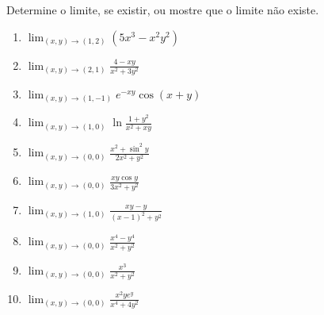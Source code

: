 \documentclass[11pt,a4paper]{article}
\newcommand{\limite}{\displaystyle\lim}
\begin{document}
\begin{enumerate}
Determine o limite, se existir, ou mostre que o limite não existe.
	
	\begin{enumerate}
		\item $\limite_{(x,y) \to (1,2)} (5x^3 - x^2y^2)$
		\item $\limite_{(x,y) \to (2,1)} \displaystyle\frac{4 - xy}{x^2 + 3y^2}$
		
		
		
		
		
		
		
		
		
		
		
		
		
		
		
		
		
		
		
		
		
		
		
		
		
		
		\item $\limite_{(x,y) \to (1,-1)} e^{-xy}\cos (x + y)$
		\item $\limite_{(x,y) \to (1,0)} \ln \displaystyle\frac{1 + y^2}{x^2 + xy}$
		\item $\limite_{(x,y) \to (0,0)} \displaystyle\frac{x^2 + \sin^2 y}{2x^2 + y^2}$
		\item $\limite_{(x,y) \to (0,0)} \displaystyle\frac{xy\cos y}{3x^2 + y^2}$
		\item $\limite_{(x,y) \to (1,0)} \displaystyle\frac{xy - y}{(x - 1)^2 + y^2}$
		\item $\limite_{(x,y) \to (0,0)} \displaystyle\frac{x^4 - y^4}{x^2 + y^2}$
		\item $\limite_{(x,y) \to (0,0)} \displaystyle\frac{x^3}{x^2 + y^2}$			
		\item $\limite_{(x,y) \to (0,0)} \displaystyle\frac{x^2ye^y}{x^4 + 4y^2}$	
		
		
		
		
		
		
		
		
		
		
		
		
		
		
		
		
		
		
		
		
		

\end{enumerate}
\end{enumerate}
\end{document}
